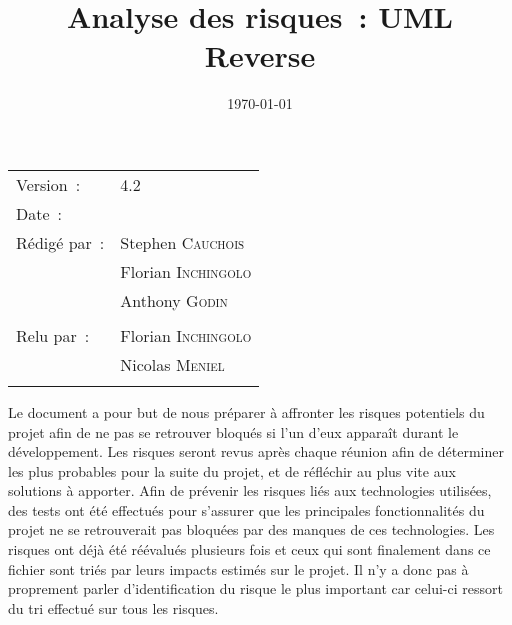 \documentclass[a4paper,10pt]{article}
\title{Analyse des risques~: UML Reverse}
\begin{document}
\maketitle
\begin{center}
\begin{tabular}{ll}
  Version~: & 4.2\\[.5em]
  Date~: & \date{\today}\\[.5em]
  Rédigé par~: & Stephen \textsc{Cauchois}\\
               & Florian \textsc{Inchingolo}\\
               & Anthony \textsc{Godin}\\
               &\\[.5em]
  Relu par~:   & Florian \textsc{Inchingolo}\\
               & Nicolas \textsc{Meniel}\\
               &\\
\end{tabular}
\end{center}
\newpage
{}
Le document a pour but de nous préparer à affronter les risques potentiels du projet 
afin de ne pas se retrouver bloqués si l’un d’eux apparaît durant le développement.
Les risques seront revus après chaque réunion afin de déterminer les plus probables pour 
la suite du projet, et de réfléchir au plus vite aux solutions à apporter.
Afin de prévenir les risques liés aux technologies utilisées, des tests ont été effectués
pour s’assurer que les principales fonctionnalités du projet ne se retrouverait pas bloquées 
par des manques de ces technologies.
Les risques ont déjà été réévalués plusieurs fois et ceux qui sont finalement dans ce fichier sont 
triés par leurs impacts estimés sur le projet. Il n’y a donc pas à proprement parler d’identification
du risque le plus important car celui-ci ressort du tri effectué sur tous les risques.
\newpage
\end{document}

